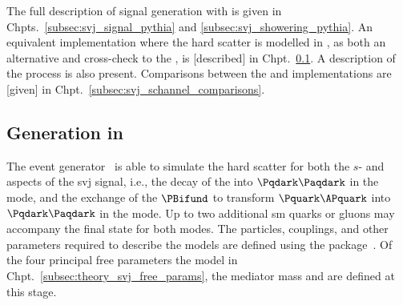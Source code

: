 
The full description of \schannel signal generation with \PYTHIAEIGHT is given in Chpts.~\ref{subsec:svj_signal_pythia} and \ref{subsec:svj_showering_pythia}. An equivalent implementation where the hard scatter is modelled in \MGvATNLO, as both an alternative and cross-check to the \PYTHIA [version], is [described] in Chpt.~\ref{subsec:svj_signal_madgraph}. A description of the \tchannel process is also present. Comparisons between the \PYTHIA and \MADGRAPH implementations are [given] in Chpt.~\ref{subsec:svj_schannel_comparisons}.






\subsection{Generation in \texorpdfstring{\MADGRAPH}{MadGraph}}
\label{subsec:svj_signal_madgraph}

The \MADGRAPHFULL event generator~\cite{Alwall:2011madgraph} is able to simulate the hard scatter for both the $s$- and \tchannel aspects of the \gls{svj} signal, i.e., the decay of the \PZprime into $\Pqdark\Paqdark$ in the \schannel mode, and the exchange of the $\PBifund$ to transform $\Pquark\APquark$ into $\Pqdark\Paqdark$ in the \tchannel mode. Up to two additional \acrlong{sm} quarks or gluons may accompany the final state for both modes. The particles, couplings, and other parameters required to describe the models are defined using the \FEYNRULES package~\cite{Alloul:2013bka}. Of the four principal free parameters the model in Chpt.~\ref{subsec:theory_svj_free_params}, the mediator mass and \mqdark are defined at this stage.

